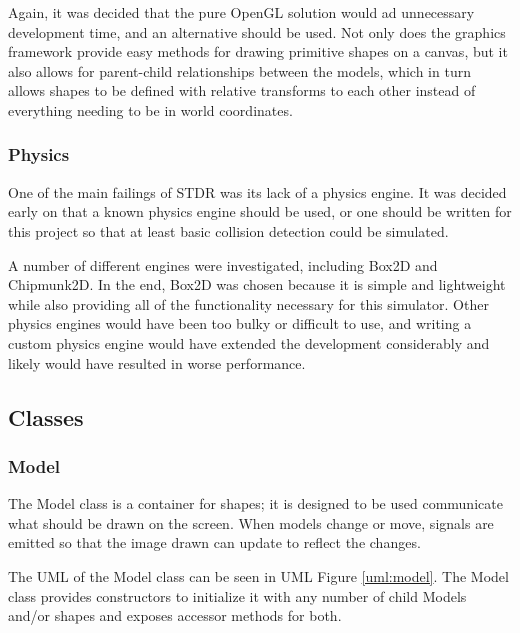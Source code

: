  	Again, it was decided that the pure OpenGL solution would ad unnecessary development time, and an alternative should be used. Not only does the graphics framework provide easy methods for drawing primitive shapes on a canvas, but it also allows for parent-child relationships between the models, which in turn allows shapes to be defined with relative transforms to each other instead of everything needing to be in world coordinates.
 	
 	\subsubsection*{Physics}
 	One of the main failings of STDR was its lack of a physics engine. It was decided early on that a known physics engine should be used, or one should be written for this project so that at least basic collision detection could be simulated.
 	
 	A number of different engines were investigated, including Box2D and Chipmunk2D. In the end, Box2D was chosen because it is simple and lightweight while also providing all of the functionality necessary for this simulator. Other physics engines would have been too bulky or difficult to use, and writing a custom physics engine would have extended the development considerably and likely would have resulted in worse performance.


 \newpage
\subsection{Classes}
  \subsubsection*{Model}
  The Model class is a container for shapes; it is designed to be used communicate what should be drawn on the screen. When models change or move, signals are emitted so that the image drawn can update to reflect the changes.
  
 	The UML of the Model class can be seen in UML Figure \ref{uml:model}. The Model class provides constructors to initialize it with any number of child Models and/or shapes and exposes accessor methods for both.

